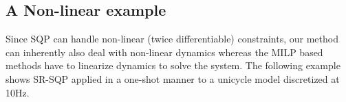 \subsection{A Non-linear example}
Since SQP can handle non-linear (twice differentiable) constraints, our method can inherently also deal with non-linear dynamics whereas the MILP based methods have to linearize dynamics to solve the system. The following example shows SR-SQP applied in a one-shot manner to a unicycle model discretized at 10Hz.

